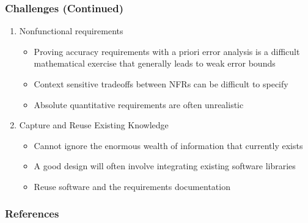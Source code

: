 \documentclass[t,12pt,numbers,fleqn]{beamer}
\newcounter{temp}
\begin{document}

\begin{frame}

\frametitle{Challenges (Continued)}

\begin{enumerate}
\setcounter{enumi}{\value{temp}}
\item Nonfunctional requirements
\begin{itemize}
\item Proving accuracy requirements with a priori error analysis is a difficult mathematical exercise that generally
leads to weak error bounds
\item Context sensitive tradeoffs between NFRs can be difficult to specify
\item Absolute quantitative requirements are often unrealistic
\end{itemize}
\item Capture and Reuse Existing Knowledge
\begin{itemize}
\item Cannot ignore the enormous wealth of information that currently exists %
\item A good design will often involve integrating existing software libraries
\item Reuse software and the requirements documentation
\end{itemize}

\setcounter{temp}{\value{enumi}}
\end{enumerate}

\end{frame}


\begin{frame}[allowframebreaks]
\frametitle{References}



\end{frame}

\end{document}
